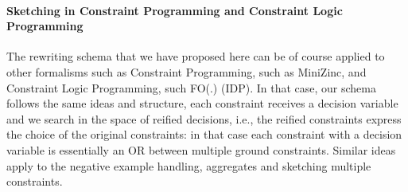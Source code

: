 \pubrev
\paragraph{Sketching in Constraint Programming and Constraint Logic Programming} The rewriting schema that we have proposed here can be of course applied to other formalisms such as Constraint Programming, such as MiniZinc, and Constraint Logic Programming, such FO(.) (IDP). In that case, our schema follows the same ideas and structure, each constraint receives a decision variable and we search in the space of reified decisions, i.e., the reified constraints express the choice of the original constraints: in that case each constraint with a decision variable is essentially an OR between multiple ground constraints. Similar ideas apply to the negative example handling, aggregates and sketching multiple constraints.
\pubrevend
